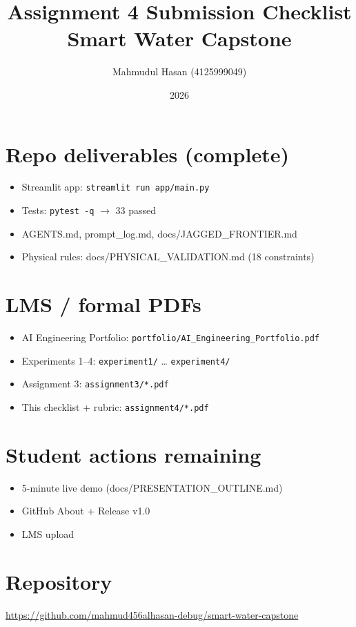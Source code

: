 \documentclass[11pt,a4paper]{article}
\title{Assignment 4 Submission Checklist\\Smart Water Capstone}
\author{Mahmudul Hasan (4125999049)}
\date{2026}
\begin{document}
\maketitle

\section{Repo deliverables (complete)}
\begin{itemize}
  \item Streamlit app: \texttt{streamlit run app/main.py}
  \item Tests: \texttt{pytest -q} $\rightarrow$ 33 passed
  \item AGENTS.md, prompt\_log.md, docs/JAGGED\_FRONTIER.md
  \item Physical rules: docs/PHYSICAL\_VALIDATION.md (18 constraints)
\end{itemize}

\section{LMS / formal PDFs}
\begin{itemize}
  \item AI Engineering Portfolio: \texttt{portfolio/AI\_Engineering\_Portfolio.pdf}
  \item Experiments 1--4: \texttt{experiment1/} … \texttt{experiment4/}
  \item Assignment 3: \texttt{assignment3/*.pdf}
  \item This checklist + rubric: \texttt{assignment4/*.pdf}
\end{itemize}

\section{Student actions remaining}
\begin{itemize}
  \item 5-minute live demo (docs/PRESENTATION\_OUTLINE.md)
  \item GitHub About + Release v1.0
  \item LMS upload
\end{itemize}

\section{Repository}
\url{https://github.com/mahmud456alhasan-debug/smart-water-capstone}
\end{document}
